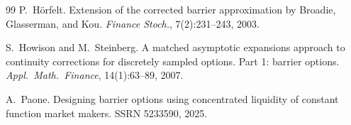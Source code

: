 \documentclass[11pt]{article}
\theoremstyle{definition}
\theoremstyle{remark}
\begin{document}
\begin{thebibliography}{99}
P.~H\"{o}rfelt.
\newblock Extension of the corrected barrier approximation by
  {B}roadie, {G}lasserman, and {K}ou.
\newblock \emph{Finance Stoch.}, 7(2):231--243, 2003.

S.~Howison and M.~Steinberg.
\newblock A matched asymptotic expansions approach to continuity
  corrections for discretely sampled options. {P}art 1: barrier options.
\newblock \emph{Appl.\ Math.\ Finance}, 14(1):63--89, 2007.

A.~Paone.
\newblock Designing barrier options using concentrated liquidity of
  constant function market makers.
\newblock SSRN 5233590, 2025.

\end{thebibliography}
\end{document}
